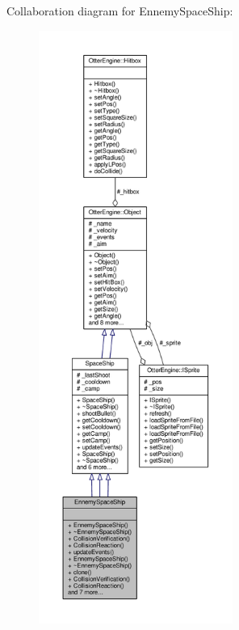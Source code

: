 Collaboration diagram for Ennemy\+Space\+Ship\+:\nopagebreak
\begin{figure}[H]
\begin{center}
\leavevmode
\includegraphics[height=550pt]{d6/dc4/class_ennemy_space_ship__coll__graph}
\end{center}
\end{figure}
